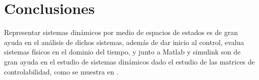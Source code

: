 \documentclass{article}
\begin{document}
\section{Conclusiones}

Representar sistemas dinámicos por medio de espacios de estados es de gran ayuda en el análisis de dichos sistemas, además de dar inicio al control, evalua sistemas físicos en el dominio del tiempo, y junto a Matlab y simulink son de gran ayuda en el estudio de sistemas dinámicos  dado el estudio de las matrices de controlabilidad, como se muestra en \cite{chatterjee2021covid}.

\lipsum[1-2][1-15]

\printbibliography[heading=bibintoc]
\end{document}
